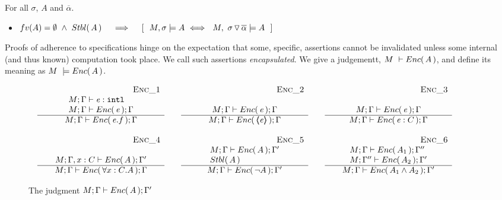 \begin{lemma}
For all $\sigma$, $A$ and $\overline \alpha$.

\begin{itemize}
\item $ fv(A)=\emptyset\ \wedge\ \Stable{A}\ \ \ \  \Longrightarrow \ \  \ \  [\ \ M, \sigma \models A \ \Longleftrightarrow \ \  M,\PushS \alpha \sigma \models A\ \ ]$
\end{itemize}
\end{lemma}

{
Proofs of adherence to {\SpecLang specifications  hinge on the expectation that some, 
specific, assertions cannot be invalidated unless some 
} internal (and thus known) computation took place. 
{We call such assertions   \emph{encapsulated}.}
}
We give a judgementt,  $M\ \vdash  {\ensuremath Enc(\, A\, )}$, and define its meaning as $M\ \models  \encaps{A}$.


\begin{figure}[thb]
$
\begin{array}{l}
\begin{array}{lclcl}
\begin{array}{c} \strut \ \ \ \ \ \ \ \ \ \ \ \ \ \ \ \ \ \ \ \ \ \ \ \ \ \ \ \ \ \ \ {{\mbox{~ \strut  {\sc{Enc\_1}}}}} \\   
\begin{array}{l}
M; \Gamma \vdash \mathit{e} : \mbox{\normalfont{\texttt{intl}}} \\
M; \Gamma \vdash {\ensuremath Enc(\, \mathit{e}\, )}; \Gamma
\end{array}
 \\ \hline 
M; \Gamma \vdash {\ensuremath Enc(\, \mathit{e}.f\, )}; \Gamma
 \end{array}
& &
\begin{array}{c} \strut \ \ \ \ \ \ \ \ \ \ \ \ \ \ \ \ \ \ \ \ \ \ \ \ \ \ \ \ \ \ \ {{\mbox{~ \strut  {\sc{Enc\_2}}}}} \\   
\\
M; \Gamma \vdash {\ensuremath Enc(\, \mathit{e}\, )}; \Gamma 
 \\ \hline 
M; \Gamma \vdash {\ensuremath Enc(\, \ensuremath{\langle\!\!\langle \mathit{e} \rangle\!\!\rangle}\, )}; \Gamma
 \end{array}
& &
\begin{array}{c} \strut \ \ \ \ \ \ \ \ \ \ \ \ \ \ \ \ \ \ \ \ \ \ \ \ \ \ \ \ \ \ \ {{\mbox{~ \strut  {\sc{Enc\_3}}}}} \\   
\\
M; \Gamma \vdash {\ensuremath Enc(\, \mathit{e}\, )}; \Gamma 
 \\ \hline 
M; \Gamma \vdash {\ensuremath Enc(\, \mathit{e}:C\, )}; \Gamma
 \end{array}
\\ \\ 
\begin{array}{c} \strut \ \ \ \ \ \ \ \ \ \ \ \ \ \ \ \ \ \ \ \ \ \ \ \ \ \ \ \ \ \ \ {{\mbox{~ \strut  {\sc{Enc\_4}}}}} \\   
\\
M; \Gamma, {x:C} \vdash {\ensuremath Enc(\, A\, )}; \Gamma' 
 \\ \hline 
M; \Gamma \vdash {\ensuremath Enc(\, \forall {x:C}. A\, )}; \Gamma
 \end{array}
&   &
\begin{array}{c} \strut \ \ \ \ \ \ \ \ \ \ \ \ \ \ \ \ \ \ \ \ \ \ \ \ \ \ \ \ \ \ \ {{\mbox{~ \strut  {\sc{Enc\_5}}}}} \\    
\begin{array}{l}
M; \Gamma \vdash {\ensuremath Enc(\, A\, )}; \Gamma'\\  {Stbl(\, A\, )}
\end{array}
 \\ \hline 
M; \Gamma \vdash {\ensuremath Enc(\,  \neg A\, )}; \Gamma'  
 \end{array}
&    &
\begin{array}{c} \strut \ \ \ \ \ \ \ \ \ \ \ \ \ \ \ \ \ \ \ \ \ \ \ \ \ \ \ \ \ \ \ {{\mbox{~ \strut  {\sc{Enc\_6}}}}} \\   
\begin{array}{l}
M; \Gamma \vdash {\ensuremath Enc(\, A_1\, )}; \Gamma''   \\
  M; \Gamma'' \vdash {\ensuremath Enc(\,  A_2\, )}; \Gamma' 
  \end{array} 
 \\ \hline 
M; \Gamma \vdash {\ensuremath Enc(\, A_1 \wedge A_2\, )}; \Gamma'
 \end{array}
\end{array}
\end{array}
$
\caption{The judgment $M; \Gamma \vdash {\ensuremath Enc(\, A\, )}; \Gamma'$}
\label{f:encaps}
\end{figure}
 

